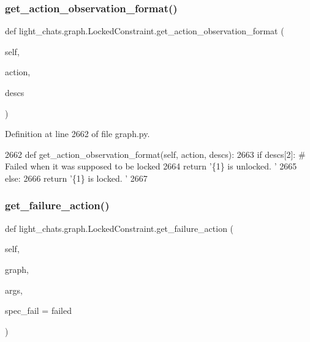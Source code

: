 \subsubsection{\texorpdfstring{get\+\_\+action\+\_\+observation\+\_\+format()}{get\_action\_observation\_format()}}
{\footnotesize\ttfamily def light\+\_\+chats.\+graph.\+Locked\+Constraint.\+get\+\_\+action\+\_\+observation\+\_\+format (\begin{DoxyParamCaption}\item[{}]{self,  }\item[{}]{action,  }\item[{}]{descs }\end{DoxyParamCaption})}



Definition at line 2662 of file graph.\+py.


\begin{DoxyCode}
2662     \textcolor{keyword}{def }get\_action\_observation\_format(self, action, descs):
2663         \textcolor{keywordflow}{if} descs[2]:  \textcolor{comment}{# Failed when it was supposed to be locked}
2664             \textcolor{keywordflow}{return} \textcolor{stringliteral}{'\{1\} is unlocked. '}
2665         \textcolor{keywordflow}{else}:
2666             \textcolor{keywordflow}{return} \textcolor{stringliteral}{'\{1\} is locked. '}
2667 
\end{DoxyCode}
\mbox{\label{classlight__chats_1_1graph_1_1LockedConstraint_afd686dd0264132ac553f932d6670f8f1}} 
\subsubsection{\texorpdfstring{get\+\_\+failure\+\_\+action()}{get\_failure\_action()}}
{\footnotesize\ttfamily def light\+\_\+chats.\+graph.\+Locked\+Constraint.\+get\+\_\+failure\+\_\+action (\begin{DoxyParamCaption}\item[{}]{self,  }\item[{}]{graph,  }\item[{}]{args,  }\item[{}]{spec\+\_\+fail = {\ttfamily \textquotesingle{}failed\textquotesingle{}} }\end{DoxyParamCaption})}



